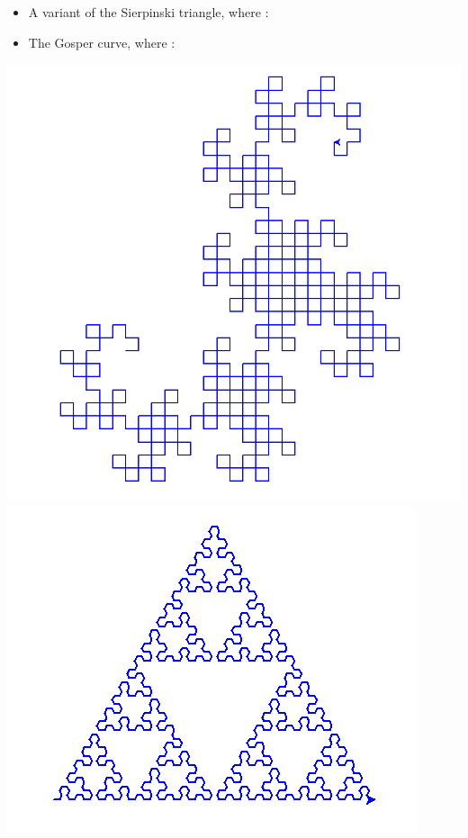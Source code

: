 \documentclass[11pt,class=report,crop=false]{standalone}
\begin{document}
\begin{activite}
\begin{enumerate}
\begin{itemize}
	\item A variant of the Sierpinski triangle, where  :	

\item The Gosper curve, where :
	  
	\end{itemize}
	
\begin{center}
\includegraphics[scale=\myscale,scale=0.15]{screen-lsystems-8}\quad
\includegraphics[scale=\myscale,scale=0.33]{screen-lsystems-9}\quad

\end{center}
\end{enumerate}
\end{activite}
\end{document}
